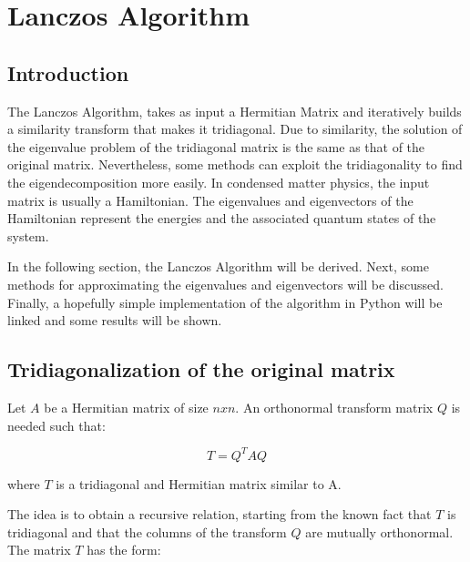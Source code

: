 \section{Lanczos Algorithm}
\label{app:lanczos}

\subsection{Introduction}

The Lanczos Algorithm, takes as input a Hermitian Matrix and iteratively builds a similarity transform that makes it tridiagonal. Due to similarity, the solution of the eigenvalue problem of the tridiagonal matrix is the same as that of the original matrix. Nevertheless, some methods can exploit the tridiagonality to find the eigendecomposition more easily. In condensed matter physics, the input matrix is usually a Hamiltonian. The eigenvalues and eigenvectors of the Hamiltonian represent the energies and the associated quantum states of the system. 

In the following section, the Lanczos Algorithm will be derived. Next, some methods for approximating the eigenvalues and eigenvectors will be discussed. Finally, a hopefully simple implementation of the algorithm in Python will be linked and some results will be shown.

\subsection{Tridiagonalization of the original matrix}

Let $A$ be a Hermitian matrix of size $nxn$. An orthonormal transform matrix $Q$ is needed such that:

\[ T = Q^{T}AQ \]

where $T$ is a tridiagonal and Hermitian matrix similar to A.

The idea is to obtain a recursive relation, starting from the known fact that $T$ is tridiagonal and that the columns of the transform $Q$ are mutually orthonormal. The matrix $T$ has the form:

